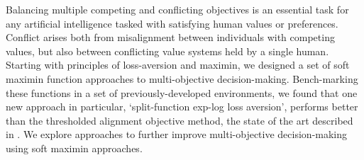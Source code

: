 
Balancing multiple competing and conflicting objectives is an essential task for any artificial intelligence tasked with satisfying human values or preferences. Conflict arises both from misalignment between individuals with competing values, but also between conflicting value systems held by a single human. Starting with principles of loss-aversion and maximin, we designed a set of soft maximin function approaches to multi-objective decision-making. Bench-marking these functions in a set of previously-developed environments, we found that one new approach in particular, `split-function exp-log loss aversion', performs better than the thresholded alignment objective method, the state of the art described in \cite{vamplew_potential-based_2021}. We explore approaches to further improve multi-objective decision-making using soft maximin approaches.

